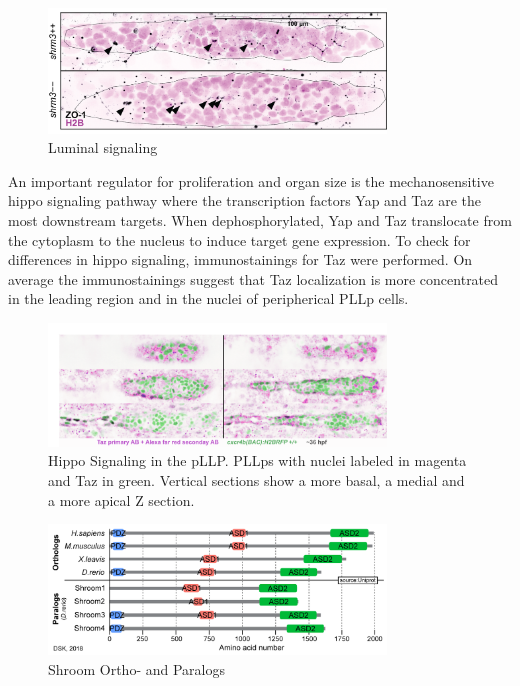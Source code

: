 \documentclass[11pt,singlespacinge,twoside]{reedthesis} %
\begin{document}
\begin{figure}

{\centering \includegraphics[width=0.8\textwidth]{figures/supp/zo1} 

}

\caption[Luminal signaling]{Luminal signaling}\label{fig:suppzo1}
\end{figure}
An important regulator for proliferation and organ size is the mechanosensitive hippo signaling pathway where the transcription factors Yap and Taz are the most downstream targets. When dephosphorylated, Yap and Taz translocate from the cytoplasm to the nucleus to induce target gene expression.
To check for differences in hippo signaling, immunostainings for Taz were performed. On average the immunostainings suggest that Taz localization is more concentrated in the leading region and in the nuclei of peripherical PLLp cells.


\begin{figure}

{\centering \includegraphics[width=0.8\textwidth]{figures/supp/immunos} 

}

\caption[Hippo Signaling in the pLLP]{Hippo Signaling in the pLLP. PLLps with nuclei labeled in magenta and Taz in green. Vertical sections show a more basal, a medial and a more apical Z section.}\label{fig:suppyap}
\end{figure}

\begin{figure}

{\centering \includegraphics[width=0.8\textwidth]{figures/supp/Shroom3_orthology-01} 

}

\caption[Shroom Ortho- and Paralogs]{Shroom Ortho- and Paralogs}\label{fig:suppshrmort}
\end{figure}
\end{document}
